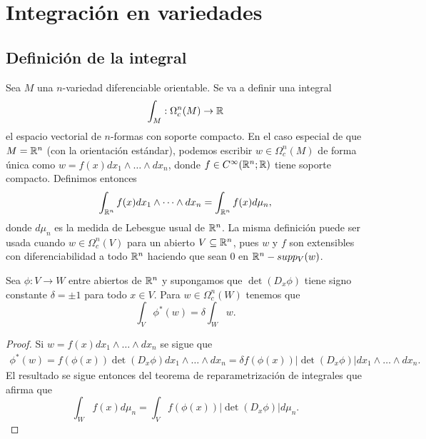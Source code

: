 \documentclass[CV.tex]{subfiles}
\begin{document}

\chapter{Integración en variedades}






\section{Definición de la integral}

Sea $M$ una $n$-variedad diferenciable orientable. Se va a definir una integral
\[
\int_M:\Omega_c^n(M)\to\mathbb{R}
\]
el espacio vectorial de $n$-formas con soporte compacto. En el caso especial de que $M=\mathbb{R}^n$ (con la orientación estándar), podemos escribir $w\in\Omega_c^n(M)$ de forma única como $w=f(x)dx_1\land\dots\land dx_n$, donde $f\in C^{\infty}(\mathbb{R}^n;\mathbb{R})$ tiene soporte compacto. Definimos entonces
\[
\int_{\mathbb{R}^n}f(x)dx_1\land\dots\land dx_n=\int_{\mathbb{R}^n} f(x)d\mu_n,
\]
donde $d\mu_n$ es la medida de Lebesgue usual de $\mathbb{R}^n$. La misma definición puede ser usada cuando $w\in\Omega_c^n(V)$ para un abierto $V\subseteq\mathbb{R}^n$, pues $w$ y $f$ son extensibles con diferenciabilidad a todo $\mathbb{R}^n$ haciendo que sean 0 en $\mathbb{R}^n-supp_V(w)$. 

\begin{lemma}
Sea $\phi:V\to W$ entre abiertos de $\mathbb{R}^n$ y supongamos que $\det(D_x\phi)$ tiene signo constante $\delta=\pm 1$ para todo $x\in V$. Para $w\in\Omega_c^n(W)$ tenemos que
\[
\int_V\phi^*(w)=\delta\int_Ww.
\]
\end{lemma}
\begin{proof}
Si $w=f(x)dx_1\land\dots\land dx_n$ se sigue que
\begin{align*}
\phi^*(w)=f(\phi(x))\det(D_x\phi)dx_1\land\dots\land dx_n=\delta f(\phi(x))|\det(D_x\phi)|dx_1\land\dots\land dx_n.
\end{align*}
El resultado se sigue entonces del teorema de reparametrización de integrales que afirma que
\[
\int_W f(x)d\mu_n=\int_V f(\phi(x))|\det(D_x\phi)|d\mu_n.
\]
\end{proof}
\end{document}
